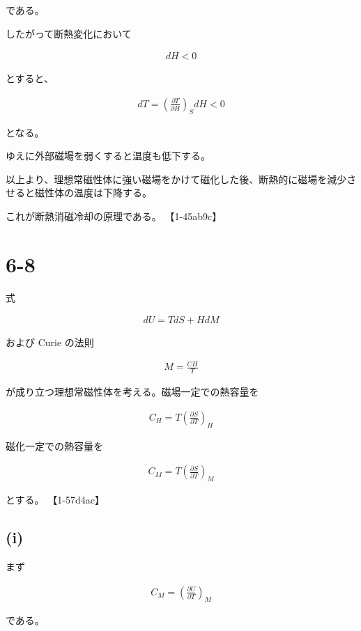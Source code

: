 \documentclass[platex,dvipdfmx,a4paper]{jsarticle}
\begin{document}
である。

したがって断熱変化において

\begin{align*}
dH<0
\end{align*}

とすると、

\begin{align*}
dT
=
\left(
\frac{\partial T}{\partial H}
\right)_S
dH
<
0
\end{align*}

となる。

ゆえに外部磁場を弱くすると温度も低下する。

以上より、理想常磁性体に強い磁場をかけて磁化した後、断熱的に磁場を減少させると磁性体の温度は下降する。

これが断熱消磁冷却の原理である。 【1-45ab9c】
\section{6-8}

式

\begin{align*}
dU
=
TdS+HdM
\end{align*}

および Curie の法則

\begin{align*}
M=\frac{CH}{T}
\end{align*}

が成り立つ理想常磁性体を考える。磁場一定での熱容量を

\begin{align*}
C_H
=
T
\left(
\frac{\partial S}{\partial T}
\right)_H
\end{align*}

磁化一定での熱容量を

\begin{align*}
C_M
=
T
\left(
\frac{\partial S}{\partial T}
\right)_M
\end{align*}

とする。 【1-57d4ac】

\subsection{(i)}

まず

\begin{align*}
C_M
=
\left(
\frac{\partial U}{\partial T}
\right)_M
\end{align*}

である。
\end{document}
